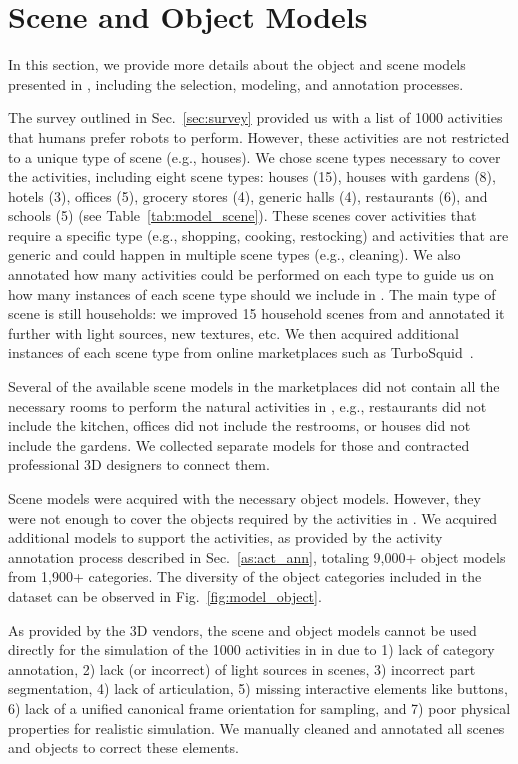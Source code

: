 \section{Scene and Object Models}
\label{as:modeling}
In this section, we provide more details about the object and scene models presented in \dataset, including the selection, modeling, and annotation processes.

The survey outlined in Sec.~\ref{sec:survey} provided us with a list of 1000 activities that humans prefer robots to perform. However, these activities are not restricted to a unique type of scene (e.g., houses). We chose scene types necessary to cover the \benchmark activities, including eight scene types: houses (15), houses with gardens (8), hotels (3), offices (5), grocery stores (4), generic halls (4), restaurants (6), and schools (5) (see Table~\ref{tab:model_scene}). These scenes cover activities that require a specific type (e.g., shopping, cooking, restocking) and activities that are generic and could happen in multiple scene types (e.g., cleaning). We also annotated how many activities could be performed on each type to guide us on how many instances of each scene type should we include in \dataset. The main type of scene is still households: we improved 15 household scenes from \oldbenchmark and annotated it further with light sources, new textures, etc. We then acquired additional instances of each scene type from online marketplaces such as TurboSquid~\cite{turbosquid}. 

Several of the available scene models in the marketplaces did not contain all the necessary rooms to perform the natural activities in \benchmark, e.g., restaurants did not include the kitchen, offices did not include the restrooms, or houses did not include the gardens.
We collected separate models for those and contracted professional 3D designers to connect them.

Scene models were acquired with the necessary object models. However, they were not enough to cover the objects required by the activities in \benchmark. 
We acquired additional models to support the activities, as provided by the activity annotation process described in Sec.~\ref{as:act_ann}, totaling 9,000+ object models from 1,900+ categories. The diversity of the object categories included in the dataset can be observed in Fig.~\ref{fig:model_object}.

As provided by the 3D vendors, the scene and object models cannot be used directly for the simulation of the 1000 activities in \benchmark in \simulator due to 1) lack of category annotation, 2) lack (or incorrect) of light sources in scenes, 3) incorrect part segmentation, 4) lack of articulation, 5) missing interactive elements like buttons, 6) lack of a unified canonical frame orientation for sampling, and 7) poor physical properties for realistic simulation. We manually cleaned and annotated all scenes and objects to correct these elements.

